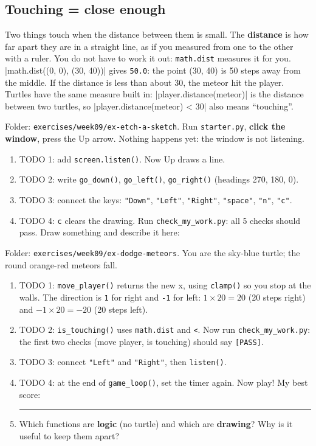 \subsection{Touching = close enough}
Two things touch when the distance between them is small. The \textbf{distance} is how far apart they are in a straight line,
as if you measured from one to the other with a ruler. You do not have to work it out: \texttt{math.dist} measures it for you.
\py|math.dist((0, 0), (30, 40))| gives \texttt{50.0}: the point (30, 40) is 50 steps away from the middle.
If the distance is less than about 30, the meteor hit the player.
Turtles have the same measure built in: \py|player.distance(meteor)| is the distance between two turtles, so
\py|player.distance(meteor) < 30| also means \enquote{touching}.

\begin{exercise}
Folder: \texttt{exercises/week09/ex-etch-a-sketch}. Run \texttt{starter.py}, \textbf{click the window}, press the Up arrow.
Nothing happens yet: the window is not listening.
\begin{enumerate}[leftmargin=1.4em]
  \item TODO 1: add \texttt{screen.listen()}. Now Up draws a line.
  \item TODO 2: write \texttt{go\_down()}, \texttt{go\_left()}, \texttt{go\_right()} (headings 270, 180, 0).
  \item TODO 3: connect the keys: \texttt{"Down"}, \texttt{"Left"}, \texttt{"Right"}, \texttt{"space"}, \texttt{"n"}, \texttt{"c"}.
  \item TODO 4: \texttt{c} clears the drawing. Run \texttt{check\_my\_work.py}: all 5 checks should pass.
        Draw something and describe it here: 
\end{enumerate}
\end{exercise}

\begin{exercise}
Folder: \texttt{exercises/week09/ex-dodge-meteors}. You are the sky-blue turtle; the round orange-red meteors fall.
\begin{enumerate}[leftmargin=1.4em]
  \item TODO 1: \texttt{move\_player()} returns the new x, using \texttt{clamp()} so you stop at the walls.
        The direction is \texttt{1} for right and \texttt{-1} for left: $1 \times 20 = 20$ (20 steps right) and
        $-1 \times 20 = -20$ (20 steps left).
  \item TODO 2: \texttt{is\_touching()} uses \texttt{math.dist} and \texttt{<}. Now run \texttt{check\_my\_work.py}: the first two checks
        (move player, is touching) should say \texttt{[PASS]}.
  \item TODO 3: connect \texttt{"Left"} and \texttt{"Right"}, then \texttt{listen()}.
  \item TODO 4: at the end of \texttt{game\_loop()}, set the timer again. Now play! My best score: \rule{2cm}{0.4pt}
  \item Which functions are \textbf{logic} (no turtle) and which are \textbf{drawing}? Why is it useful to keep them apart? 
\end{enumerate}
\end{exercise}


